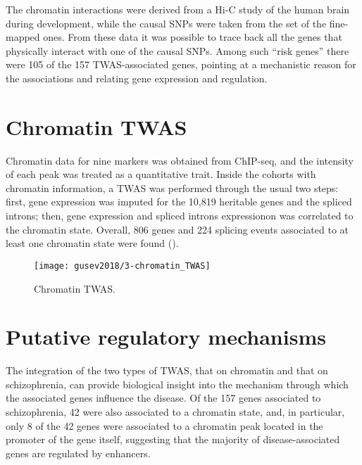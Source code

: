 \documentclass[../main.tex]{subfiles}
\begin{document}
The chromatin interactions were derived from a Hi-C study of the human 
brain during development, while the causal SNPs were taken from the set 
of the fine-mapped ones. From these data it 
was possible to trace back all the genes that physically interact with 
one of the causal SNPs. Among such \enquote{risk genes} there were 105 
of the 157 TWAS-associated genes, pointing at a mechanistic reason for 
the associations and relating gene expression and regulation.

\section{Chromatin TWAS}

Chromatin data for nine markers was obtained from 
ChIP-seq, and the intensity of each peak was treated as a quantitative trait. 
Inside the cohorts with chromatin information, a TWAS was performed 
through the usual two steps: first, gene expression was imputed for the 
10,819 heritable genes and the spliced introns; then, gene expression 
and spliced introns expressionon was correlated to the chromatin state. 
Overall, 806 genes and 224 splicing events associated to at least one 
chromatin state were found ().

\begin{figure}
	\texttt{[image: gusev2018/3-chromatin\_TWAS]}
	\caption{Chromatin TWAS.}
\end{figure}

\section{Putative regulatory mechanisms}

The integration of the two types of TWAS, that on chromatin and that on 
schizophrenia, can provide biological insight into the mechanism through 
which the associated genes influence the disease. Of the 157 genes 
associated to schizophrenia, 42 were also associated to a chromatin 
state, and, in particular, only 8 of the 42 genes were associated to a 
chromatin peak located in the promoter of the gene itself, suggesting 
that the majority of disease-associated genes are regulated by 
enhancers.
\end{document}
